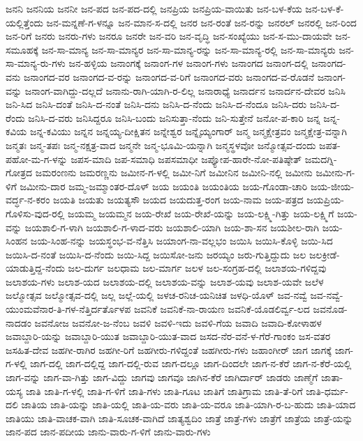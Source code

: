 ಜನನಿ
ಜನನಿಯ
ಜನನೀ
ಜನ-ಪದ
ಜನ-ಪದ-ದಲ್ಲಿ
ಜನಪ್ರಿಯ
ಜನಪ್ರಿಯ-ವಾಯಿತು
ಜನ-ಬಳ-ಕೆಯ
ಜನ-ಬಳ-ಕೆ-ಯಲ್ಲಿತ್ತೆಂದು
ಜನ-ಮನ್ನಣೆ-ಗ-ಳನ್ನೂ
ಜನ-ಮಾನ-ಸ-ದಲ್ಲಿ
ಜನರ
ಜನ-ರಂತೆ
ಜನ-ರನ್ನು
ಜನರಲ್
ಜನರಲ್ಲಿ
ಜನ-ರಿಂದ
ಜನ-ರಿಗೆ
ಜನರು
ಜನರು-ಗಳು
ಜನರೂ
ಜನರೇ
ಜನ-ವರಿ
ಜನ-ವೃದ್ಧಿ
ಜನ-ಸಂಖ್ಯೆಯು
ಜನ-ಸ-ಮು-ದಾಯವೇ
ಜನ-ಸಮೂಹಕ್ಕೆ
ಜನ-ಸಾ-ಮಾನ್ಯ
ಜನ-ಸಾ-ಮಾನ್ಯರ
ಜನ-ಸಾ-ಮಾನ್ಯ-ರನ್ನು
ಜನ-ಸಾ-ಮಾನ್ಯ-ರಲ್ಲಿ
ಜನ-ಸಾ-ಮಾನ್ಯರು
ಜನ-ಸಾ-ಮಾನ್ಯ-ರು-ಗಳು
ಜನ-ಹಳ್ಳಿಯ
ಜನಾಂಗಕ್ಕೆ
ಜನಾಂಗ-ಗಳ
ಜನಾಂಗ-ಗಳು
ಜನಾಂಗದ
ಜನಾಂಗ-ದಲ್ಲಿ
ಜನಾಂಗದ-ವನು
ಜನಾಂಗದ-ವರ
ಜನಾಂಗದ-ವ-ರನ್ನು
ಜನಾಂಗದ-ವ-ರಿಗೆ
ಜನಾಂಗದ-ವರು
ಜನಾಂಗದ-ವ-ರೊಡನೆ
ಜನಾಂಗ-ವನ್ನು
ಜನಾಂಗ-ವಾಗಿದ್ದು-ದಲ್ಲದೆ
ಜನಾನು-ರಾಗಿ-ಯಾಗಿ-ರ-ಲಿಲ್ಲ
ಜನಾರಾಧ್ಯೆ
ಜನಾರ್ದನ
ಜನಾರ್ದನ-ದೇವರ
ಜನಿಸಿ
ಜನಿ-ಸಿದ
ಜನಿಸಿ-ದಂತೆ
ಜನಿಸಿ-ದ-ನಂತೆ
ಜನಿಸಿ-ದನು
ಜನಿಸಿ-ದ-ನೆಂದು
ಜನಿಸಿ-ದ-ನೆಂದೂ
ಜನಿಸಿ-ದರು
ಜನಿಸಿ-ದ-ರೆಂದು
ಜನಿಸಿ-ದ-ವರು
ಜನಿಸಿದ್ದರೂ
ಜನಿಸಿ-ಬಂದು
ಜನಿಸುತ್ತಾ-ನೆಂದು
ಜನಿ-ಸುತ್ತೇನೆ
ಜನೋ-ಪ-ಕಾರಿ
ಜನ್ನ
ಜನ್ನ-ಕವಿಯ
ಜನ್ನ-ಕವಿಯು
ಜನ್ನನ
ಜನ್ನಯ್ಯ-ದೀಕ್ಷಿತನ
ಜನ್ನೇಶ್ವರ
ಜನ್ನೈಯ್ಯಂಗಾರ್
ಜನ್ಮ
ಜನ್ಮಕ್ಷೇತ್ರವಂ
ಜನ್ಮಕ್ಷೇತ್ರ-ವನ್ನಾಗಿ
ಜನ್ಮತಃ
ಜನ್ಮ-ತಪಃ
ಜನ್ಮ-ನಕ್ಷತ್ರ-ವಾದ
ಜನ್ಮನೇ
ಜನ್ಮ-ಭೂಮಿ-ಯನ್ನಾಗಿ
ಜನ್ಮಸ್ಥಳವೋ
ಜನ್ಮೋತ್ಸವ-ದಂದು
ಜಪತ-ಪಹೋ-ಮ-ಗ-ಳನ್ನು
ಜಪಸ-ಮಾದಿ
ಜಪ-ಸಮಾಧಿ
ಜಪಸಮಾಧೀ
ಜಪ್ಯೋಪ-ಹಾರೇ-ನೋ-ಪತಿಷ್ಠೇತ್
ಜಮದಗ್ನಿ-ಗೋತ್ರದ
ಜಮರಂಣನು
ಜಮರಣ್ಣನು
ಜಮೀನ-ಗ-ಳಲ್ಲಿ
ಜಮೀ-ನಿಗೆ
ಜಮೀನಿನ
ಜಮೀನಿ-ನಲ್ಲಿ
ಜಮೀನು
ಜಮೀನು-ಗ-ಳಿಗೆ
ಜಮೀನು-ದಾರ
ಜಮ್ಮ-ಜಮ್ಮಾಂತರ-ದೊಳ್
ಜಯ
ಜಯಂತಿ
ಜಯಂತಿಯ
ಜಯ-ಗೊಂಡಾ-ಚಾರಿ
ಜಯ-ಜೀಯ-ವರ್ದ್ಧ-ನ-ಕರಂ
ಜಯತಿ
ಜಯತು
ಜಯತ್ಯಸೌ
ಜಯದ
ಜಯದುತ್ತ-ರಂಗ
ಜಯ-ನಾಮ
ಜಯ-ಪತ್ರದ
ಜಯಪ್ರಿಯ-ಗೊಳಿಸು-ವುದ-ರಲ್ಲಿ
ಜಯಮ್ಮ
ಜಯಮ್ಮನ
ಜಯ-ರೇಖೆ
ಜಯ-ರೇಖೆ-ಯನ್ನು
ಜಯ-ಲಕ್ಷ್ಮಿ-ಗಿತ್ತು
ಜಯ-ಲಕ್ಷ್ಮಿಗೆ
ಜಯ-ವನ್ನು
ಜಯಶಾಲಿ-ಗ-ಳಾಗಿ
ಜಯಶಾಲಿ-ಗ-ಳಾದ-ವರು
ಜಯಶಾಲಿ-ಯಾಗಿ
ಜಯ-ಶಾ-ಸನ
ಜಯಶೀಲ-ರಾಗಿ
ಜಯ-ಸಿಂಹನ
ಜಯ-ಸಿಂಹ-ನನ್ನು
ಜಯಸ್ಥಂಭ-ವ-ನೆತ್ತಿಸಿ
ಜಯಾಂಗ-ನಾ-ವಲ್ಲಭಂ
ಜಯಿಸಿ
ಜಯಿಸಿ-ಕೊಳ್ಳಿ
ಜಯಿ-ಸಿದ
ಜಯಿಸಿ-ದ-ನಂತೆ
ಜಯಿಸಿ-ದ-ನೆಂದು
ಜಯಿ-ಸಿದ್ದ
ಜಯಿಸೋ-ಜನು
ಜರಯ್ಯಂ
ಜರು-ಗುತ್ತಿದ್ದುದು
ಜಲ
ಜಲಕ್ರೀಡೆ-ಯಾಡುತ್ತಿದ್ದ-ನೆಂದು
ಜಲ-ದುರ್ಗ
ಜಲಧಾಮ
ಜಲ-ಮಾರ್ಗ
ಜಲಳ
ಜಲ-ಸಂಗ್ರಹ-ದಲ್ಲಿ
ಜಲಾಶಯ-ಗಳಿದ್ದವು
ಜಲಾಶಯ-ಗಳು
ಜಲಾಶ-ಯದ
ಜಲಾಶಯ-ದಲ್ಲಿ
ಜಲಾಶಯ-ವನ್ನು
ಜಲಾಶ-ಯವು
ಜಲಾಶ-ಯವೇ
ಜಲೆಳ
ಜಲ್ಮೋತ್ಸವ
ಜಲ್ಮೋತ್ಸವ-ದಲ್ಲಿ
ಜಲ್ಲ
ಜಲ್ಲೆ-ಯಲ್ಲಿ
ಜಳಚ-ರನಿಚ-ಯನಿಚಿತ
ಜಳಧಿ-ಯೊಳ್
ಜವ-ನವ್ವೆ
ಜವ-ನವ್ವೆ-ಯುಂಮವೆನಾರ-ತಿ-ಗಳ-ನೆತ್ತಿರ್ದರ್ತೊಳಪ
ಜವನಿಕೆ
ಜವನಿಕೆ-ನಾ-ರಾಯಣ
ಜವನಿಕೆ-ಯೊಡಲಿರ್ವ್ವ-ಲದ
ಜವನೊಡ-ನಾದಡಂ
ಜವನೋಜ
ಜವನೋ-ಜ-ನೆಂಬ
ಜವಳಿ
ಜವಳಿ-ಇದು
ಜವಳಿ-ಗೆಯ
ಜವಾದಿ
ಜವಾದಿ-ಕೋಳಾಹಳ
ಜವಾಬ್ದಾರಿ-ಯನ್ನು
ಜವಾಬ್ದಾರಿ-ಯುತ
ಜವಾಬ್ದಾರಿ-ಯುತ-ವಾದ
ಜಸದ-ನೆರ-ವನೆ-ಳ-ಗೆರೆ-ಗಾಂಕಂ
ಜಸ-ವತರ
ಜಸಹಿತ-ದೇವ
ಜಹಗೀ-ರಾಗಿರ
ಜಹಗೀ-ರಿಗೆ
ಜಹಗೀರು-ಗಳಿದ್ದಂತೆ
ಜಹಗೀರು-ಗಳು
ಜಹಾಂಗೀರ್
ಜಾಗ
ಜಾಗಕ್ಕೆ
ಜಾಗ-ಗ-ಳಲ್ಲಿ
ಜಾಗ-ದಲ್ಲಿ
ಜಾಗ-ದಲ್ಲಿದ್ದ
ಜಾಗ-ದಲ್ಲಿ-ರುವ
ಜಾಗ-ದಲ್ಲೂ
ಜಾಗ-ದಿಂದಲೇ
ಜಾಗ-ನ-ಕೆರೆ
ಜಾಗ-ನ-ಕೆರೆ-ಯಲ್ಲಿ
ಜಾಗ-ವನ್ನು
ಜಾಗ-ವಾ-ಗಿತ್ತು
ಜಾಗ-ವಿದ್ದು
ಜಾಗವು
ಜಾಗವೂ
ಜಾಗಿನ-ಕೆರೆ
ಜಾಗಿರ್ದಾರ್
ಜಾಡರು
ಜಾಣ್ಮೆಗೆ
ಜಾತಾ-ಯಸ್ಯ
ಜಾತಿ
ಜಾತಿ-ಗ-ಳಲ್ಲಿ
ಜಾತಿ-ಗ-ಳಿಗೆ
ಜಾತಿ-ಗಳು
ಜಾತಿ-ಗೂಟ
ಜಾತಿಗೆ
ಜಾತಿಗ್ರಾಮ
ಜಾತಿ-ತೆ-ರಿಗೆ
ಜಾತಿ-ಧರ್ಮ-ದಲಿ
ಜಾತಿಯ
ಜಾತಿ-ಯನ್ನು
ಜಾತಿ-ಯಲ್ಲಿ
ಜಾತಿ-ಯ-ವರು
ಜಾತಿ-ಯ-ವರೂ
ಜಾತಿ-ಯಾಗಿ-ರ-ಬ-ಹುದು
ಜಾತಿ-ಯಾದ
ಜಾತಿಯು
ಜಾತಿ-ವಾಚಕ-ವಾಗಿ
ಜಾತಿ-ಸೂಚಕ-ವಾಗಿದೆ
ಜಾತ್ಯಶ್ವದಿಂ
ಜಾತ್ರೆ
ಜಾತ್ರೆ-ಗಳು
ಜಾತ್ರೆಗೆ
ಜಾತ್ರೆಯ
ಜಾತ್ರೆ-ಯನ್ನು
ಜಾನ-ಪದ
ಜಾನ-ಪದೀಯ
ಜಾನು-ವಾರು-ಗ-ಳಿಗೆ
ಜಾನು-ವಾರು-ಗಳು
